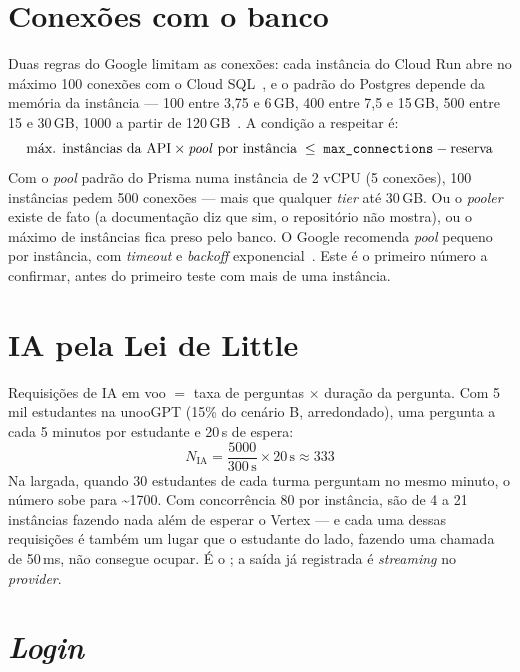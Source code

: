 \documentclass[11pt, a4paper, oneside, openany]{report}
\begin{document}
\section{Conexões com o banco}

Duas regras do Google limitam as conexões: cada instância do Cloud Run abre no
máximo 100 conexões com o Cloud SQL~\cite{gcsqlconnectrun}, e o
 padrão do Postgres depende da memória da instância ---
100 entre 3,75 e 6\,GB, 400 entre 7,5 e 15\,GB, 500 entre 15 e 30\,GB,
\num{1000} a partir de 120\,GB~\cite{gcsqlflags}. A condição a respeitar é:
\begin{equation}
  \text{máx. instâncias da API} \times \text{\emph{pool} por instância}
  \;\leq\; \texttt{max\_connections} - \text{reserva}
\end{equation}
Com o \emph{pool} padrão do Prisma numa instância de 2 vCPU (5 conexões), 100
instâncias pedem 500 conexões --- mais que qualquer \emph{tier} até 30\,GB. Ou
o \emph{pooler} existe de fato (a documentação diz que sim, o repositório não
mostra), ou o máximo de instâncias fica preso pelo banco. O Google recomenda
\emph{pool} pequeno por instância, com \emph{timeout} e \emph{backoff}
exponencial~\cite{gcsqlmanageconn}. Este é o primeiro número a confirmar, antes
do primeiro teste com mais de uma instância.

\section{IA pela Lei de Little}

Requisições de IA em voo $=$ taxa de perguntas $\times$ duração da pergunta.
Com 5 mil estudantes na unooGPT (15\% do cenário B, arredondado), uma pergunta a
cada 5 minutos por estudante e 20\,s de espera:
\begin{equation}
  N_{\text{IA}} = \frac{5000}{300\,\text{s}} \times 20\,\text{s} \approx 333
\end{equation}
Na largada, quando 30 estudantes de cada turma perguntam no mesmo minuto, o
número sobe para \textasciitilde\num{1700}. Com concorrência 80 por instância,
são de 4 a 21 instâncias fazendo nada além de esperar o Vertex --- e cada
uma dessas requisições é também um lugar que o estudante do lado, fazendo uma
chamada de 50\,ms, não consegue ocupar. É o ; a saída já registrada é
\emph{streaming} no \emph{provider}.

\section{\emph{Login}}
\end{document}
